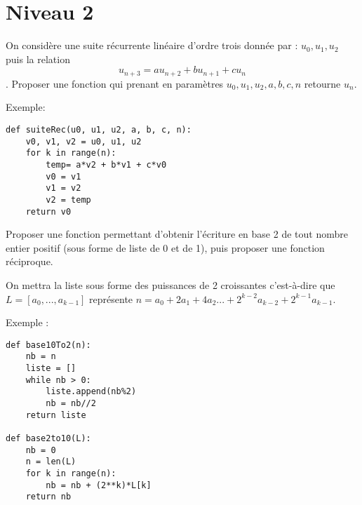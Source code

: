 \section{Niveau 2}
\begin{Exercise}
On considère une suite récurrente linéaire d'ordre trois donnée par : $u_0 , u_1 , u_2$ puis la relation $$u_{n+3}=au_{n+2}+bu_{n+1}+cu_n$$. Proposer une fonction qui prenant en paramètres
$u_0,u_1,u_2,a,b,c,n$ retourne $u_n $.

 Exemple: 
\end{Exercise}
\begin{Answer}
\begin{lstlisting}
def suiteRec(u0, u1, u2, a, b, c, n):
    v0, v1, v2 = u0, u1, u2
    for k in range(n):
        temp= a*v2 + b*v1 + c*v0
        v0 = v1
        v1 = v2
        v2 = temp
    return v0
\end{lstlisting}
\end{Answer}
\begin{Exercise}
Proposer une fonction permettant d'obtenir l'écriture en base 2 de tout nombre entier positif (sous forme de liste de 0 et de 1), puis proposer une fonction réciproque. 

On mettra la liste sous forme des puissances de 2 croissantes c'est-à-dire que $L=[a_0,...,a_{k-1}]$ représente $n=  a_{0}+ 2 a_1 + 4a_2...+2^{k-2} a_{k-2}+ 2^{k-1}a_{k-1}$.

Exemple : 
\end{Exercise}
\begin{Answer}
\begin{lstlisting}
def base10To2(n):
    nb = n
    liste = []
    while nb > 0:
        liste.append(nb%2)
        nb = nb//2
    return liste
    
def base2to10(L):
    nb = 0
    n = len(L)
    for k in range(n):
        nb = nb + (2**k)*L[k]
    return nb
\end{lstlisting}
\end{Answer}
